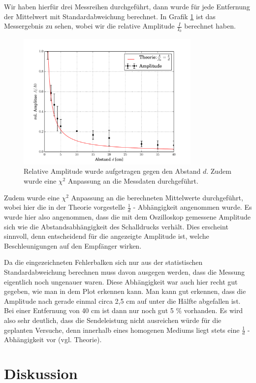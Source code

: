 \documentclass[12pt,a4paper,titlepage,headinclude,bibtotoc]{scrartcl}
\begin{document}
Wir haben hierfür drei Messreihen durchgeführt, dann wurde für jede Entfernung der Mittelwert mit Standardabweichung berechnet. In Grafik \ref{fig:schall} ist das Messergebnis zu sehen, wobei wir die relative Amplitude $\frac{I}{I_0}$ berechnet haben.

\begin{figure}[h]
	\centering
	\includegraphics[width=0.8\textwidth]{schall.pdf}
	\caption{Relative Amplitude wurde aufgetragen gegen den Abstand $d$. Zudem wurde eine $\chi^2$ Anpassung an die Messdaten durchgeführt.}
	\label{fig:schall}
\end{figure}

Zudem wurde eine $\chi^2$ Anpassung an die berechneten Mittelwerte durchgeführt, wobei hier die in der Theorie vorgestelle $\frac{1}{d}$ - Abhängigkeit angenommen wurde.
Es wurde hier also angenommen, dass die mit dem Oszilloskop gemessene Amplitude sich wie die Abstandsabhängigkeit des Schalldrucks verhält.
Dies erscheint sinnvoll, denn entscheidend für die angezeigte Amplitude ist, welche Beschleunigungen auf den Empfänger wirken.


Da die eingezeichneten Fehlerbalken sich nur aus der statistischen Standardabweichung berechnen muss davon ausgegen werden, dass die Messung eigentlich noch ungenauer waren. Diese Abhängigkeit war auch hier recht gut gegeben, wie man in dem Plot erkennen kann. 
Man kann gut erkennen, dass die Amplitude nach gerade einmal circa 2,5 cm auf unter die Hälfte abgefallen ist. Bei einer Entfernung von 40 cm ist dann nur noch gut 5 $\%$ vorhanden. Es wird also sehr deutlich, dass die Sendeleistung nicht ausreichen würde für die geplanten Versuche, denn innerhalb eines homogenen Mediums liegt stets eine $\frac{1}{d}$ -Abhängigkeit vor (vgl. Theorie). 


\section{Diskussion}
\label{sec:diskussion}
\end{document}
